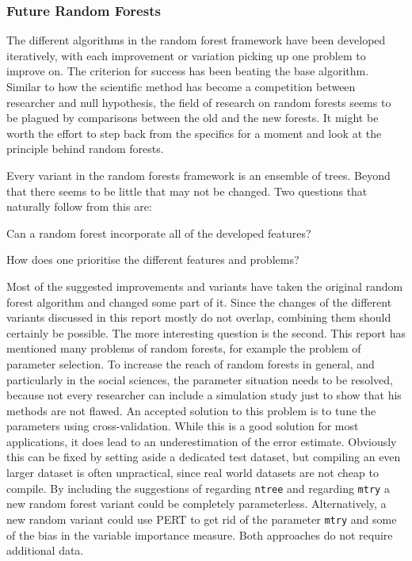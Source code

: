 \documentclass[a4paper,man,12pt,apacite,floatsintext]{apa6} %
\begin{document}
\subsubsection{Future Random Forests}
The different algorithms in the random forest framework have been developed
iteratively, with each improvement or variation picking up one problem to
improve on.
The criterion for success has been beating the base algorithm.
Similar to how the scientific method has become a competition between
researcher and null hypothesis, the field of research on random forests seems
to be plagued by comparisons between the old and the new forests.
It might be worth the effort to step back from the specifics for a moment
and look at the principle behind random forests.

Every variant in the random forests framework is an ensemble of trees.
Beyond that there seems to be little that may not be changed.
Two questions that naturally follow from this are:

\begin{APAenumerate}
\item Can a random forest incorporate all of the developed features?
\item How does one prioritise the different features and problems?
\end{APAenumerate}

Most of the suggested improvements and variants have taken the original
random forest algorithm and changed some part of it. Since the changes of
the different variants discussed in this report mostly do not overlap, combining
them should certainly be possible.
The more interesting question is the second.
This report has mentioned many problems of random forests, for example the
problem of parameter selection.
To increase the reach of random forests in general, and particularly in
the social sciences, the parameter situation needs to be resolved, because
not every researcher can include a simulation study just to show that his
methods are not flawed.
An accepted solution to this problem is to tune the parameters using cross-validation.
While this is a good solution for most applications, it does lead to an
underestimation of the error estimate.
Obviously this can be fixed by setting aside a dedicated test dataset, but
compiling an even larger dataset is often unpractical, since real world datasets
are not cheap to compile.
By including the suggestions of  regarding
\texttt{ntree} and  regarding \texttt{mtry}
a new random forest variant could be completely parameterless.
Alternatively, a new random variant could use PERT to get rid of the
parameter \texttt{mtry} and some of the bias in the variable importance
measure.
Both approaches do not require additional data.
\end{document}
